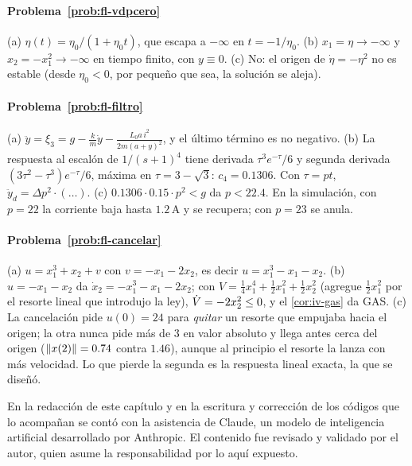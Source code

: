\paragraph{Problema~\ref{prob:fl-vdpcero}}
(a) $\eta(t)=\eta_0/(1+\eta_0t)$, que escapa a $-\infty$ en $t=-1/\eta_0$. (b) $x_1=\eta\to-\infty$ y $x_2=-x_1^2\to-\infty$ en tiempo finito, con $y\equiv0$. (c) No: el origen de $\dot\eta=-\eta^2$ no es estable (desde $\eta_0<0$, por pequeño que sea, la solución se aleja).

\paragraph{Problema~\ref{prob:fl-filtro}}
(a) $\ddot y=\xi_3=g-\frac km\dot y-\frac{L_0a\,i^2}{2m(a+y)^2}$, y el último término es no negativo. (b) La respuesta al escalón de $1/(s+1)^4$ tiene derivada $\tau^3e^{-\tau}/6$ y segunda derivada $(3\tau^2-\tau^3)e^{-\tau}/6$, máxima en $\tau=3-\sqrt3$: $c_4=0.1306$. Con $\tau=pt$, $\ddot y_d=\Delta p^2\cdot(\dots)$. (c) $0.1306\cdot0.15\cdot p^2<g$ da $p<22.4$. En la simulación, con $p=22$ la corriente baja hasta $1.2$\,A y se recupera; con $p=23$ se anula.

\paragraph{Problema~\ref{prob:fl-cancelar}}
(a) $u=x_1^3+x_2+v$ con $v=-x_1-2x_2$, es decir $u=x_1^3-x_1-x_2$. (b) $u=-x_1-x_2$ da $\dot x_2=-x_1^3-x_1-2x_2$; con $V=\tfrac14x_1^4+\tfrac12x_1^2+\tfrac12x_2^2$ (agregue $\tfrac12x_1^2$ por el resorte lineal que introdujo la ley), $\dot V=-2x_2^2\le0$, y el \cref{cor:iv-gas} da GAS. (c) La cancelación pide $u(0)=24$ para \emph{quitar} un resorte que empujaba hacia el origen; la otra nunca pide más de $3$ en valor absoluto y llega antes cerca del origen ($\left\lVert x(2)\right\rVert=0.74$ contra $1.46$), aunque al principio el resorte la lanza con más velocidad. Lo que pierde la segunda es la respuesta lineal exacta, la que se diseñó.

\respuestaspausas

\begin{parallevar}
En la redacción de este capítulo y en la escritura y corrección de los códigos que lo acompañan se contó con la asistencia de Claude, un modelo de inteligencia artificial desarrollado por Anthropic. El contenido fue revisado y validado por el autor, quien asume la responsabilidad por lo aquí expuesto.
\end{parallevar}

